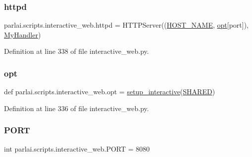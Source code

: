 \subsubsection{\texorpdfstring{httpd}{httpd}}
{\footnotesize\ttfamily parlai.\+scripts.\+interactive\+\_\+web.\+httpd = H\+T\+T\+P\+Server((\hyperlink{namespaceparlai_1_1scripts_1_1interactive__web_ac440a61641ae161806beba8dbb9d39b8}{H\+O\+S\+T\+\_\+\+N\+A\+ME}, \hyperlink{namespaceparlai_1_1scripts_1_1interactive__web_a022cc4d0c500e7a2ba643446d3b0e6ef}{opt}\mbox{[}\textquotesingle{}port\textquotesingle{}\mbox{]}), \hyperlink{classparlai_1_1scripts_1_1interactive__web_1_1MyHandler}{My\+Handler})}



Definition at line 338 of file interactive\+\_\+web.\+py.

\mbox{\label{namespaceparlai_1_1scripts_1_1interactive__web_a022cc4d0c500e7a2ba643446d3b0e6ef}} 
\subsubsection{\texorpdfstring{opt}{opt}}
{\footnotesize\ttfamily def parlai.\+scripts.\+interactive\+\_\+web.\+opt = \hyperlink{namespaceparlai_1_1scripts_1_1interactive__web_abeab09cab4f9e60077ffd5050bff36ef}{setup\+\_\+interactive}(\hyperlink{namespaceparlai_1_1scripts_1_1interactive__web_a86b356c6390faf2398bdbde02a6664d6}{S\+H\+A\+R\+ED})}



Definition at line 336 of file interactive\+\_\+web.\+py.

\mbox{\label{namespaceparlai_1_1scripts_1_1interactive__web_adab4200a8fab70115b4a5c6592ba596a}} 
\subsubsection{\texorpdfstring{P\+O\+RT}{PORT}}
{\footnotesize\ttfamily int parlai.\+scripts.\+interactive\+\_\+web.\+P\+O\+RT = 8080}



